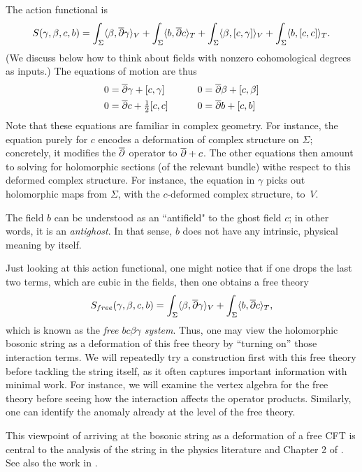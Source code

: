 The action functional is
\begin{equation}\label{bosaction}
S(\gamma,\beta,c,b) = 
\int_\Sigma \langle \beta, \overline{\partial} \gamma \rangle_V 
+ \int_\Sigma \langle b, \overline{\partial} c \rangle_T 
+ \int_\Sigma \langle \beta, [c,\gamma] \rangle_V 
+ \int_\Sigma \langle b, [c,c] \rangle_T.
\end{equation}
(We discuss below how to think about fields with nonzero cohomological degrees as inputs.)
The equations of motion are thus
\begin{alignat*}{2}
0 &= \overline{\partial} \gamma + [c,\gamma] & \quad\quad  0 &= \overline{\partial} \beta + [c,\beta] \\
0  &= \overline{\partial} c + \tfrac{1}{2} [c,c] & \quad\quad  0 &= \overline{\partial} b + [c,b] 
\end{alignat*}
Note that these equations are familiar in complex geometry.
For instance, the equation purely for $c$ encodes a deformation of complex structure on $\Sigma$; concretely, it modifies the $\overline{\partial}$ operator to $\overline{\partial} + c$.
The other equations then amount to solving for holomorphic sections (of the relevant bundle) withe respect to this deformed complex structure.
For instance, the equation in $\gamma$ picks out holomorphic maps from $\Sigma$,
with the $c$-deformed complex structure, to~$V$.

The field $b$ can be understood as an ``antifield" to the ghost field $c$; in other words, it is an {\em antighost}.
In that sense, $b$ does not have any intrinsic, physical meaning by itself.  

\begin{rmk}
\label{rmk:bcbg}
Just looking at this action functional, one might notice that if one drops the last two terms,
which are cubic in the fields, then one obtains a free theory
\begin{equation}
S_{free}(\gamma,\beta,c,b) = 
\int_\Sigma \langle \beta, \overline{\partial} \gamma \rangle_V 
+ \int_\Sigma \langle b, \overline{\partial} c \rangle_T,
\end{equation}
which is known as the {\em free $bc\beta\gamma$ system}.
Thus, one may view the holomorphic bosonic string as a deformation of this free theory
by ``turning on'' those interaction terms.
We will repeatedly try a construction first with this free theory before tackling the string itself,
as it often captures important information with minimal work.
For instance, we will examine the vertex algebra for the free theory before seeing how the interaction affects the operator products.
Similarly, one can identify the anomaly already at the level of the free theory.

This viewpoint of arriving at the bosonic string as a deformation of a free CFT is central to the analysis of the string in the physics literature \cite{GSW1} and Chapter 2 of \cite{polchinski}. 
See also the work in \cite{Scherk}. 
\end{rmk}

